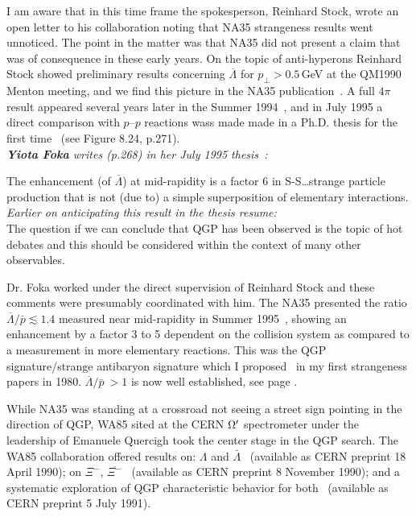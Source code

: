 I am aware that in this time frame the spokesperson, Reinhard Stock, wrote an open letter to his collaboration noting that NA35 strangeness results went unnoticed. The point in the matter was that NA35 did not present a claim that was of consequence in these early years. On the topic of anti-hyperons Reinhard Stock showed preliminary results concerning $\overline{\Lambda}$ for $p_\bot>0.5$\,GeV at the QM1990 Menton meeting, and we find this picture in the NA35 publication~\cite{Bachler:1992js}. A full $4\pi$ result appeared several years later in the Summer 1994~\cite{Alber:1994tz}, and in July 1995 a direct comparison with $p$--$p$ reactions wass made made in a Ph.D. thesis for the first time~\cite{Foka:1995Thesis} (see Figure 8.24, p.271).\\

\noindent \textit{\textbf{Yiota Foka} writes (p.268) in her July 1995 thesis~\cite{Foka:1995Thesis}:} \\[-0.7cm]
%
\begin{mdframed}[linecolor=gray,roundcorner=12pt,backgroundcolor=GreenYellow!15,linewidth=1pt,leftmargin=0cm,rightmargin=0cm,topline=true,bottomline=true,skipabove=12pt]\relax%
%
The enhancement (of $\overline{\Lambda}$) at mid-rapidity is a factor 6 in S-S\ldots strange particle production that is not (due to) a simple superposition of elementary interactions. \\
\textit{Earlier on anticipating this result in the thesis resume:}\\
The question if we can conclude that QGP has been observed is the topic of hot debates and this should be considered within the context of many other observables. 
%
\end{mdframed}
\vskip 0.5cm

Dr. Foka worked under the direct supervision of Reinhard Stock and these comments were presumably coordinated with him. The NA35 presented the ratio $ \overline{\Lambda}/ \bar p\lesssim 1.4$ measured near mid-rapidity in Summer 1995~\cite{Alber:1996mq}, showing an enhancement by a factor 3 to 5 dependent on the collision system as compared to a measurement in more elementary reactions. This was the QGP signature/strange antibaryon signature which I proposed~\cite{Rafelski:1980rk,Rafelski:1980fy} in my first strangeness papers in 1980. $ \overline{\Lambda}/ \bar p\ > 1 $ is now well established, see page \pageref{RLam}.

While NA35 was standing at a crossroad not seeing a street sign pointing in the direction of QGP, WA85 sited at the CERN $\Omega\rq$ spectrometer under the leadership of Emanuele Quercigh took the center stage in the QGP search. The WA85 collaboration offered results on: $\Lambda$ and $\bar{\Lambda}$~\cite{Abatzis:1990cm} (available as CERN preprint 18 April 1990); on $\Xi^-$, $\overline{\Xi^-}$~\cite{Abatzis:1990gz} (available as CERN preprint 8 November 1990); and a systematic exploration of QGP characteristic behavior for both~\cite{Abatzis:1991ju} (available as CERN preprint 5 July 1991).\\

